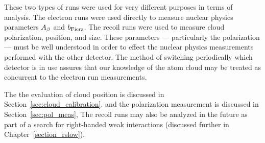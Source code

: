 
These two types of runs were used for very different purposes in terms of analysis.  The electron runs were used directly to measure nuclear physics parameters $A_{\beta}$ and $b_{\mathrm{Fierz}}$.  The recoil runs were used to measure cloud polarization, position, and size.  These parameters --- particularly the polarization --- must be well understood in order to effect the nuclear physics measurements performed with the other detector.  The method of switching periodically which detector is in use assures that our knowledge of the atom cloud may be treated as concurrent to the electron run measurements.

The the evaluation of cloud position is discussed in Section~\ref{sec:cloud_calibration}.
and the polarization measurement is discussed in Section~\ref{sec:pol_meas},
The recoil runs may also be analyzed in the future as part of a search for right-handed weak interactions (discussed further in Chapter~\ref{section_rslow}).



